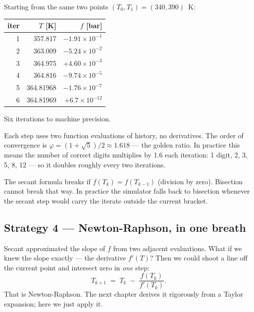 \documentclass[11pt,a4paper]{article}
\begin{document}
\begin{example}
Starting from the same two points $(T_0, T_1) = (340, 390)$~K:
\begin{center}\small
\begin{tabular}{rrr}
\toprule
iter & $T$ [K] & $f$ [bar]\\
\midrule
1 & 357.817 & $-1.91\times 10^{-1}$\\
2 & 363.009 & $-5.24\times 10^{-2}$\\
3 & 364.975 & $+4.60\times 10^{-3}$\\
4 & 364.816 & $-9.74\times 10^{-5}$\\
5 & 364.81968 & $-1.76\times 10^{-7}$\\
6 & 364.81969 & $+6.7\times 10^{-12}$\\
\bottomrule
\end{tabular}
\end{center}
Six iterations to machine precision.
\end{example}

Each step uses two function evaluations of history, no derivatives.
The order of convergence is $\varphi = (1 + \sqrt{5})/2 \approx
1.618$ --- the golden ratio.  In practice this means the number of
correct digits multiplies by 1.6 each iteration: 1 digit, 2, 3, 5,
8, 12 --- so it doubles roughly every two iterations.

\begin{pitfall}
The secant formula breaks if $f(T_k) = f(T_{k-1})$ (division by
zero).  Bisection cannot break that way.  In practice the simulator
falls back to bisection whenever the secant step would carry the
iterate outside the current bracket.
\end{pitfall}

\subsection{Strategy 4 --- Newton-Raphson, in one breath}

Secant approximated the slope of $f$ from two adjacent evaluations.
What if we knew the slope exactly --- the derivative $f'(T)$?  Then
we could shoot a line off the current point and intersect zero in
\emph{one} step:
\begin{equation}
   \boxed{\;
   T_{k+1} \;=\; T_k \;-\; \frac{f(T_k)}{f'(T_k)}.
   \;}
\end{equation}
That is Newton-Raphson.  The next chapter derives it rigorously
from a Taylor expansion; here we just apply it.
\end{document}

